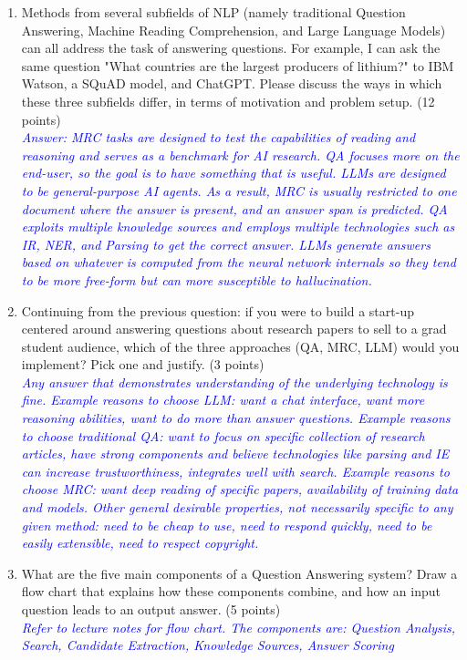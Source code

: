 \documentclass[12pt]{article}
\newcommand{\solution}[2]{\\[2mm] \textcolor{blue}{\em #1}} %
\begin{document}
\begin{enumerate}
\item Methods from several subfields of NLP (namely traditional Question Answering, Machine Reading Comprehension, and Large Language Models) can all address the task of answering questions. For example, I can ask the same question "What countries are the largest producers of lithium?" to IBM Watson, a SQuAD model, and ChatGPT. Please discuss the ways in which these three subfields differ, in terms of motivation and problem setup. (12 points)
\solution{Answer: MRC tasks are designed to test the capabilities of reading and reasoning and serves as a benchmark for AI research. QA focuses more on the end-user, so the goal is to have something that is useful. LLMs are designed to be general-purpose AI agents. As a result, MRC is usually restricted to one document where the answer is present, and an answer span is predicted. QA exploits multiple knowledge sources and employs multiple technologies such as IR, NER, and Parsing to get the correct answer. LLMs generate answers based on whatever is computed from the neural network internals so they tend to be more free-form but can more susceptible to hallucination.}{\vspace{8cm}}
\item Continuing from the previous question: if you were to build a start-up centered around answering questions about research papers to sell to a grad student audience, which of the three approaches (QA, MRC, LLM) would you implement? Pick one and justify. (3 points)
\solution{Any answer that demonstrates understanding of the underlying technology is fine. Example reasons to choose LLM: want a chat interface, want more reasoning abilities, want to do more than answer questions. Example reasons to choose traditional QA: want to focus on specific collection of research articles, have strong components and believe technologies like parsing and IE can increase trustworthiness, integrates well with search. Example reasons to choose MRC: want deep reading of specific papers, availability of training data and models. Other general desirable properties, not necessarily specific to any given method: need to be cheap to use, need to respond quickly, need to be easily extensible, need to respect copyright.}{\vspace{3cm}}
\item What are the five main components of a Question Answering system? Draw a flow chart that explains how these components combine, and how an input question leads to an output answer. (5 points)
\solution{Refer to lecture notes for flow chart. The components are: Question Analysis, Search, Candidate Extraction, Knowledge Sources, Answer Scoring}{}
\end{enumerate}
\end{document}
